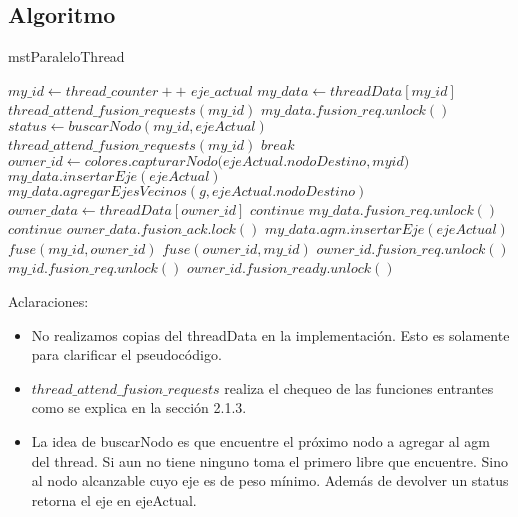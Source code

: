 \subsection{Algoritmo}
\begin{algorithm}
\begin{algorithmic}
\caption{mstParaleloThread}
\STATE $my\_id \gets thread\_counter++ $
\STATE $eje\_actual$
\STATE $my\_data \gets threadData[my\_id]$
\STATE $thread\_attend\_fusion\_requests(my\_id)$
\STATE $my\_data.fusion\_req.unlock()$
\STATE $status \gets buscarNodo(my\_id,ejeActual)$
\STATE $thread\_attend\_fusion\_requests(my\_id)$
\ENDIF
{}
\STATE $break$
\ENDIF
\STATE $owner\_id \gets colores.capturarNodo(ejeActual.nodoDestino,my$\textunderscore$id)$
\STATE $my\_data.insertarEje(ejeActual)$
\STATE $my\_data.agregarEjesVecinos(g,ejeActual.nodoDestino)$
\ELSE 
\STATE $owner\_data \gets threadData[owner\_id]$
\STATE $continue$
\ENDIF
{}
\STATE $my\_data.fusion\_req.unlock()$
\STATE $continue$
\ENDIF
\STATE $owner\_data.fusion\_ack.lock()$
\STATE $my\_data.agm.insertarEje(ejeActual)$
\STATE $fuse(my\_id,owner\_id)$
\ELSE
\STATE $fuse(owner\_id,my\_id)$
\ENDIF
\ENDIF
\ENDIF
\STATE $owner\_id.fusion\_req.unlock()$
\STATE $my\_id.fusion\_req.unlock()$
\STATE $owner\_id.fusion\_ready.unlock()$
\ENDWHILE
\end{algorithmic}
\end{algorithm}


\newpage
Aclaraciones:
\begin{itemize}
    \item No realizamos copias del threadData en la implementación. Esto es solamente para clarificar el pseudocódigo.
    \item $thread\_attend\_fusion\_requests$ realiza el chequeo de las funciones entrantes como se explica en la sección 2.1.3.
    \item La idea de buscarNodo es que encuentre el próximo nodo a agregar al agm del thread. Si aun no tiene ninguno toma el primero libre que encuentre. Sino al nodo alcanzable cuyo eje es de peso mínimo. Además de devolver un status retorna el eje en ejeActual.
\end{itemize}
